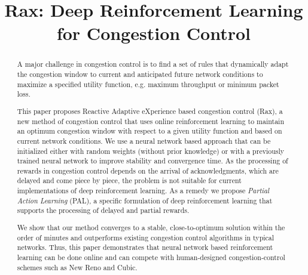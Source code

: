 \documentclass[10pt,sigconf,anonymous]{acmart}
\begin{document}
\title{Rax: Deep Reinforcement Learning for Congestion Control}

%
%


\renewcommand{\shortauthors}{X. et al.}

\begin{abstract}

A major challenge in congestion control is to find a set of rules that dynamically adapt the congestion window to current and anticipated future network conditions to maximize a specified utility function, e.g. maximum throughput or minimum packet loss. 

This paper proposes Reactive Adaptive eXperience based congestion control (Rax), a new method of congestion control that uses online reinforcement learning to maintain an optimum congestion window with respect to a given utility function and based on current network conditions. We use a neural network based approach that can be initialized either with random weights (without prior knowledge) or with a previously trained neural network to improve stability and convergence time. As the processing of rewards in congestion control depends on the arrival of acknowledgments, which are delayed and come piece by piece, the problem is not suitable for current implementations of deep reinforcement learning. As a remedy we propose \textit{Partial Action Learning} (PAL), a specific formulation of deep reinforcement learning that supports the processing of delayed and partial rewards. 

We show that our method converges to a stable, close-to-optimum solution within the order of minutes and outperforms existing congestion control algorithms in typical networks. Thus, this paper demonstrates that neural network based reinforcement learning can be done online and can compete with human-designed congestion-control schemes such as New Reno and Cubic.

\end{abstract}
\end{document}

